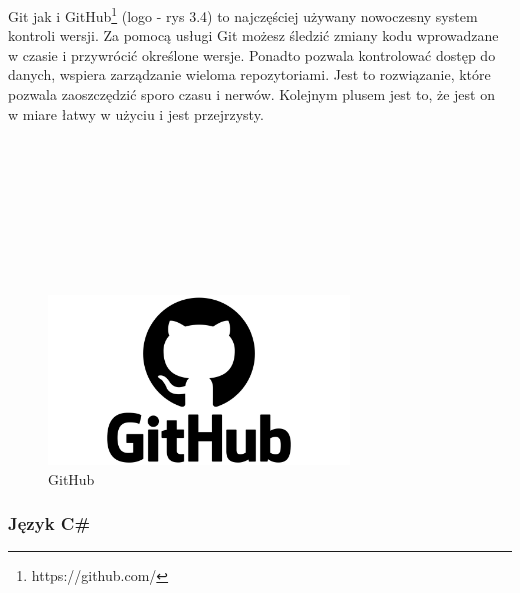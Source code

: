 \hspace*{0.60cm}Git jak i GitHub\footnote{ https://github.com/}  (logo - rys 3.4) to najczęściej używany nowoczesny system kontroli wersji. Za pomocą usługi Git możesz śledzić zmiany kodu wprowadzane \\w czasie i przywrócić określone wersje. Ponadto pozwala kontrolować dostęp do danych, wspiera zarządzanie wieloma repozytoriami. Jest to rozwiązanie, które pozwala zaoszczędzić sporo czasu i nerwów. Kolejnym plusem jest to, że jest on \\w miare łatwy w użyciu i jest przejrzysty. 
\\
\\
\\
\\
\\
\\
\\
\\
\\
	\begin{figure}[!htb]
	\begin{center}
		\includegraphics[width=8cm]{rys/git.png}
		\caption{GitHub}
		\label{rys:rysunek001}
	\end{center}
\end{figure}


\subsubsection{Język C\#}

